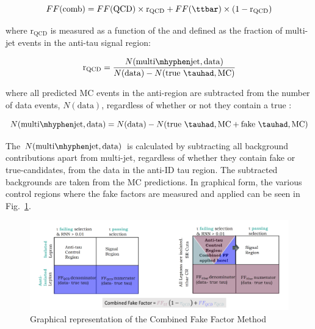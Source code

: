 \begin{equation}
FF(\mathrm{comb}) = FF(\mathrm{QCD}) \times \mathrm{r}_{\mathrm{QCD}} + FF(\ttbar) \times (1 - \mathrm{r}_{\mathrm{QCD}}) 
\end{equation} 

where $\mathrm{r}_{\mathrm{QCD}}$ is measured as a function of the \tauhad \pT and defined as the fraction of multi-jet events in the anti-tau signal region:

\begin{equation}
\mathrm{r}_{\mathrm{QCD}} = \frac{N(\mathrm{multi\mhyphen jet, data})} {N(\mathrm{data}) - N(\mathrm{true}~\tauhad, \mathrm{MC})}
\end{equation} 

where all predicted MC events in the anti-\tauhad region are subtracted from the number of data events, $N(\mathrm{data})$, regardless of whether or not they contain a true \tauhad:

\begin{equation}
N(\mathrm{multi\mhyphen jet, data}) = N(\mathrm{data}) - N(\mathrm{true}~\tauhad, \mathrm{MC} + \mathrm{fake}~\tauhad, \mathrm{MC})
\end{equation} 

The $N(\mathrm{multi\mhyphen jet, data})$ is calculated by subtracting all background contributions apart from multi-jet, regardless of whether they contain fake or true-\tauhad candidates, from the data in the anti-ID tau region. 
The subtracted backgrounds are taken from the MC predictions. In graphical form, the various control regions where the fake factors are measured and applied can be seen in Fig.~\ref{fig:CombFFMethod}.
 
\begin{figure}
\centering
\includegraphics[width=.9\textwidth]{figures/lephadFF/CombinedFFMethod.png}
\caption{Graphical representation of the Combined Fake Factor Method}
\label{fig:CombFFMethod}
\end{figure}


